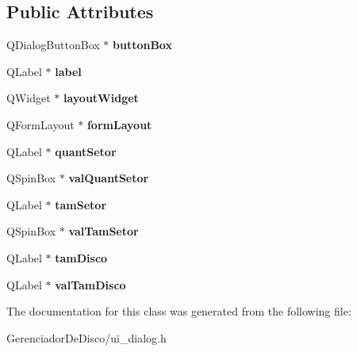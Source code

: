 \subsection*{Public Attributes}
\begin{DoxyCompactItemize}
\item 
\hypertarget{classUi__Dialog_a271a59402f80983c2722bb455db37365}{}Q\+Dialog\+Button\+Box $\ast$ {\bfseries button\+Box}\label{classUi__Dialog_a271a59402f80983c2722bb455db37365}

\item 
\hypertarget{classUi__Dialog_ac3844fd0281707dc5535826da7506ca5}{}Q\+Label $\ast$ {\bfseries label}\label{classUi__Dialog_ac3844fd0281707dc5535826da7506ca5}

\item 
\hypertarget{classUi__Dialog_aeb2e76ae84a3a2c7943003b31fab3807}{}Q\+Widget $\ast$ {\bfseries layout\+Widget}\label{classUi__Dialog_aeb2e76ae84a3a2c7943003b31fab3807}

\item 
\hypertarget{classUi__Dialog_ad9cfb27ad75b6ac3776d697f97825b71}{}Q\+Form\+Layout $\ast$ {\bfseries form\+Layout}\label{classUi__Dialog_ad9cfb27ad75b6ac3776d697f97825b71}

\item 
\hypertarget{classUi__Dialog_a2007836cd3a70e87f2a6f44f1a8126c1}{}Q\+Label $\ast$ {\bfseries quant\+Setor}\label{classUi__Dialog_a2007836cd3a70e87f2a6f44f1a8126c1}

\item 
\hypertarget{classUi__Dialog_a8fcca9006bc63d1d030bffb5b9e92ec8}{}Q\+Spin\+Box $\ast$ {\bfseries val\+Quant\+Setor}\label{classUi__Dialog_a8fcca9006bc63d1d030bffb5b9e92ec8}

\item 
\hypertarget{classUi__Dialog_ac0b324ec24e0c91a7974b9abc3a83507}{}Q\+Label $\ast$ {\bfseries tam\+Setor}\label{classUi__Dialog_ac0b324ec24e0c91a7974b9abc3a83507}

\item 
\hypertarget{classUi__Dialog_a6ba8924aa1dd286a7c6dfc6ec84a219c}{}Q\+Spin\+Box $\ast$ {\bfseries val\+Tam\+Setor}\label{classUi__Dialog_a6ba8924aa1dd286a7c6dfc6ec84a219c}

\item 
\hypertarget{classUi__Dialog_aeab04565d67cbc0f007fbfa288354c0c}{}Q\+Label $\ast$ {\bfseries tam\+Disco}\label{classUi__Dialog_aeab04565d67cbc0f007fbfa288354c0c}

\item 
\hypertarget{classUi__Dialog_a55abf6ad25c300be730eca4f5851267d}{}Q\+Label $\ast$ {\bfseries val\+Tam\+Disco}\label{classUi__Dialog_a55abf6ad25c300be730eca4f5851267d}

\end{DoxyCompactItemize}


The documentation for this class was generated from the following file\+:\begin{DoxyCompactItemize}
\item 
Gerenciador\+De\+Disco/ui\+\_\+dialog.\+h\end{DoxyCompactItemize}
